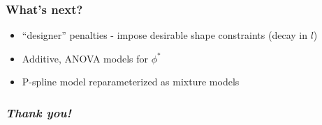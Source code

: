 \documentclass[12pt]{beamer}
\newcommand{\newmaththought}[1]{{ \color{foreground} {#1}}}
\newcommand{\mixedmodelmath}[1]{{ \color{yuppiered} {#1}}}
\newcommand{\ms}{\scriptscriptstyle}
\begin{document}
\begin{frame}
\frametitle{What's next?}

\begin{itemize}
\item ``designer'' penalties - impose desirable shape constraints (decay in $l$)
\item Additive, ANOVA models for $\phi^*$
\item P-spline model reparameterized as mixture models
\end{itemize}

\end{frame}




\begin{frame}
\frametitle{\emph{Thank you!}}


\end{frame}





%
%
%
%
%
%
%
%
%
%
%
%
%
%
\end{document}
